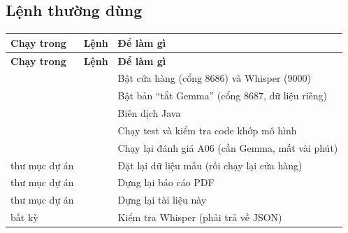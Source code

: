 \subsection{Lệnh thường dùng}
\begin{center}\small
\begin{longtable}{@{}P{2.8cm}P{6.1cm}P{6.8cm}@{}}
\toprule
\textbf{Chạy trong} & \textbf{Lệnh} & \textbf{Để làm gì}\\
\midrule\endfirsthead
\toprule
\textbf{Chạy trong} & \textbf{Lệnh} & \textbf{Để làm gì}\\
\midrule\endhead
{} &  & Bật cửa hàng (cổng 8686) và Whisper (9000)\\
 &  & Bật bản ``tắt Gemma'' (cổng 8687, dữ liệu riêng)\\
 &  & Biên dịch Java\\
 &  & Chạy test và kiểm tra code khớp mô hình\\
 &  & Chạy lại đánh giá A06 (cần Gemma, mất vài phút)\\
thư mục dự án &  & Đặt lại dữ liệu mẫu (rồi chạy lại cửa hàng)\\
thư mục dự án &  & Dựng lại báo cáo PDF\\
thư mục dự án &  & Dựng lại tài liệu này\\
bất kỳ &  & Kiểm tra Whisper (phải trả về JSON)\\
\bottomrule
\end{longtable}
\end{center}
